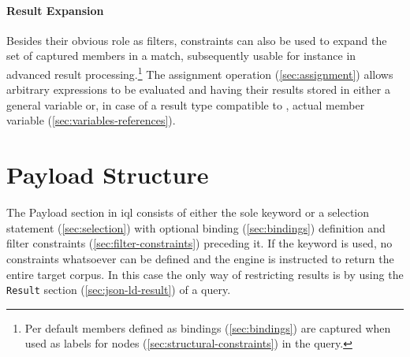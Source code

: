 \documentclass[11pt,a4paper]{report}
\newcommand{\iqlType}[1]{\texttt{\iqlns#1}}
\begin{document}
\paragraph{Result Expansion}
Besides their obvious role as filters, constraints can also be used to expand the set of captured members in a match, subsequently usable for instance in advanced result processing.\footnote{Per default members defined as bindings (\ref{sec:bindings}) are captured when used as labels for nodes (\ref{sec:structural-constraints}) in the query.}
The assignment operation (\ref{sec:assignment}) allows arbitrary expressions to be evaluated and having their results stored in either a general variable or, in case of a result type compatible to , actual member variable (\ref{sec:variables-references}).

\section{Payload Structure}
\label{sec:payload-structure}

The Payload section in \ac{iql} consists of either the sole  keyword or a selection statement (\ref{sec:selection}) with optional binding (\ref{sec:bindings}) definition and filter constraints (\ref{sec:filter-constraints}) preceding it.
If the  keyword is used, no constraints whatsoever can be defined and the engine is instructed to return the entire target corpus.
In this case the only way of restricting results is by using the \iqlType{Result} section (\ref{sec:json-ld-result}) of a query.
\end{document}
